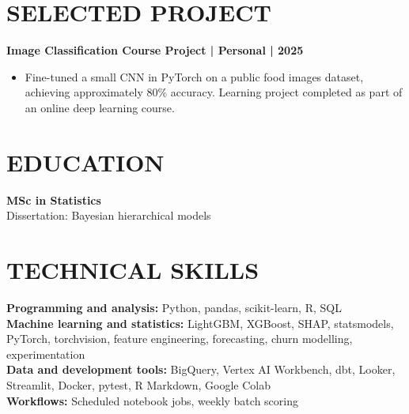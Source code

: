 \documentclass[11pt,a4paper]{article}
\begin{document}
\section*{SELECTED PROJECT}
\noindent\textbf{Image Classification Course Project | Personal | 2025}
\begin{itemize}
\item Fine-tuned a small CNN in PyTorch on a public food images dataset, achieving approximately 80\% accuracy. Learning project completed as part of an online deep learning course.
\end{itemize}

\section*{EDUCATION}
\noindent\textbf{MSc in Statistics}\\
Dissertation: Bayesian hierarchical models

\section*{TECHNICAL SKILLS}
\textbf{Programming and analysis:} Python, pandas, scikit-learn, R, SQL\\
\textbf{Machine learning and statistics:} LightGBM, XGBoost, SHAP, statsmodels, PyTorch, torchvision, feature engineering, forecasting, churn modelling, experimentation\\
\textbf{Data and development tools:} BigQuery, Vertex AI Workbench, dbt, Looker, Streamlit, Docker, pytest, R Markdown, Google Colab\\
\textbf{Workflows:} Scheduled notebook jobs, weekly batch scoring
\end{document}
